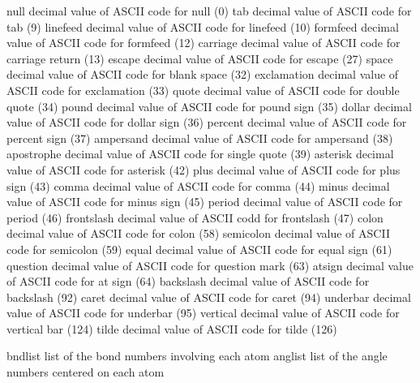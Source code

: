 \documentclass[letterpaper,11pt,english]{sphinxmanual}
\begin{document}
\begin{sphinxVerbatim}[commandchars=\\\{\}]
null            decimal value of ASCII code for null (0)
tab             decimal value of ASCII code for tab (9)
linefeed        decimal value of ASCII code for linefeed (10)
formfeed        decimal value of ASCII code for formfeed (12)
carriage        decimal value of ASCII code for carriage return (13)
escape          decimal value of ASCII code for escape (27)
space           decimal value of ASCII code for blank space (32)
exclamation     decimal value of ASCII code for exclamation (33)
quote           decimal value of ASCII code for double quote (34)
pound           decimal value of ASCII code for pound sign (35)
dollar          decimal value of ASCII code for dollar sign (36)
percent         decimal value of ASCII code for percent sign (37)
ampersand       decimal value of ASCII code for ampersand (38)
apostrophe      decimal value of ASCII code for single quote (39)
asterisk        decimal value of ASCII code for asterisk (42)
plus            decimal value of ASCII code for plus sign (43)
comma           decimal value of ASCII code for comma (44)
minus           decimal value of ASCII code for minus sign (45)
period          decimal value of ASCII code for period (46)
frontslash      decimal value of ASCII codd for frontslash (47)
colon           decimal value of ASCII code for colon (58)
semicolon       decimal value of ASCII code for semicolon (59)
equal           decimal value of ASCII code for equal sign (61)
question        decimal value of ASCII code for question mark (63)
atsign          decimal value of ASCII code for at sign (64)
backslash       decimal value of ASCII code for backslash (92)
caret           decimal value of ASCII code for caret (94)
underbar        decimal value of ASCII code for underbar (95)
vertical        decimal value of ASCII code for vertical bar (124)
tilde           decimal value of ASCII code for tilde (126)
\end{sphinxVerbatim}


\begin{sphinxVerbatim}[commandchars=\\\{\}]
bndlist         list of the bond numbers involving each atom
anglist         list of the angle numbers centered on each atom
\end{sphinxVerbatim}

\end{document}
